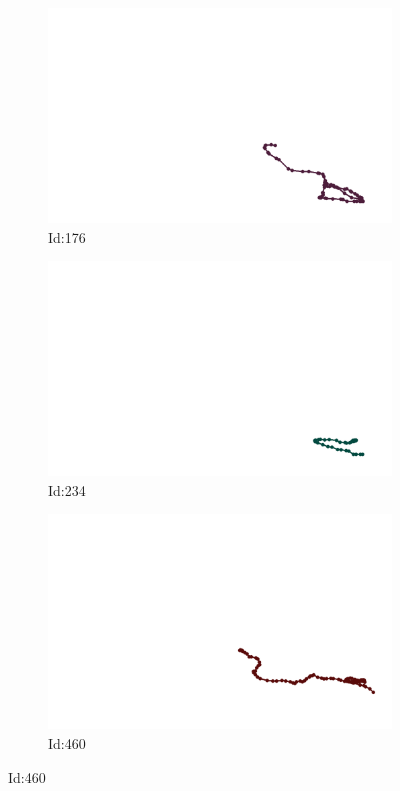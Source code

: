 \documentclass[12pt,twoside]{report}
\begin{document}
\begin{figure}
\centering
\begin{subfigure}[b]{0.20\textwidth}
\centering
\includegraphics[width=\textwidth]{../../trajectories/176.png}
\caption{Id:176}
\end{subfigure}
\begin{subfigure}[b]{0.20\textwidth}
\centering
\includegraphics[width=\textwidth]{../../trajectories/234.png}
\caption{Id:234}
\end{subfigure}
\begin{subfigure}[b]{0.20\textwidth}
\centering
\includegraphics[width=\textwidth]{../../trajectories/460.png}
\caption{Id:460}
\end{subfigure}
\end{figure}
\end{document}
